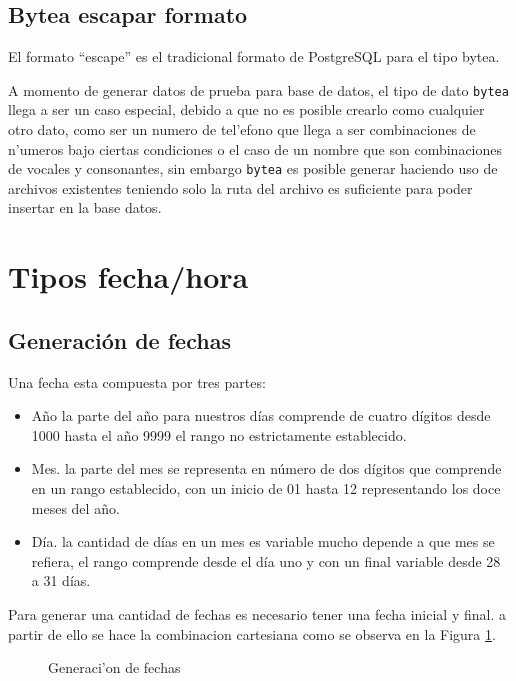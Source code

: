 \subsection{Bytea escapar formato}
El formato ``escape'' es el tradicional formato de PostgreSQL para el tipo bytea.

A momento de generar datos de prueba para base de datos, el tipo de dato \texttt{bytea} llega a ser un caso especial, debido a que no es posible crearlo como cualquier otro dato, como ser un numero de tel'efono que llega a ser combinaciones de n'umeros bajo ciertas condiciones o el caso de un nombre que son combinaciones de vocales y consonantes, sin embargo \texttt{bytea} es posible generar haciendo uso de archivos existentes teniendo solo la ruta del archivo es suficiente para poder insertar en la base datos.
\section{Tipos fecha/hora}
\subsection{Generaci\'on de fechas}
Una fecha esta compuesta por tres partes:
\begin{itemize}
\item A\~no la parte del a\~no para nuestros d\'ias comprende de cuatro d\'igitos desde 1000 hasta el a\~no 9999 el rango no estrictamente establecido.
\item
Mes. la parte del mes se representa en n\'umero de dos d\'igitos que comprende en un rango establecido, con un inicio de 01 hasta 12 representando los doce meses del a\~no.
\item
 D\'ia. la cantidad de d\'ias en un mes es variable mucho depende a que mes se refiera, el rango comprende desde el d\'ia uno y con un final variable desde 28 a 31 d\'ias.
\end{itemize}
Para generar una cantidad de fechas es necesario tener una fecha inicial y final. a partir de ello se hace la combinacion cartesiana como se observa en la Figura \ref{fig:generacion de fechas}.
\begin{figure}[H]
\centering
{}
\caption{Generaci'on de fechas} \label{fig:generacion de fechas}
\end{figure}

